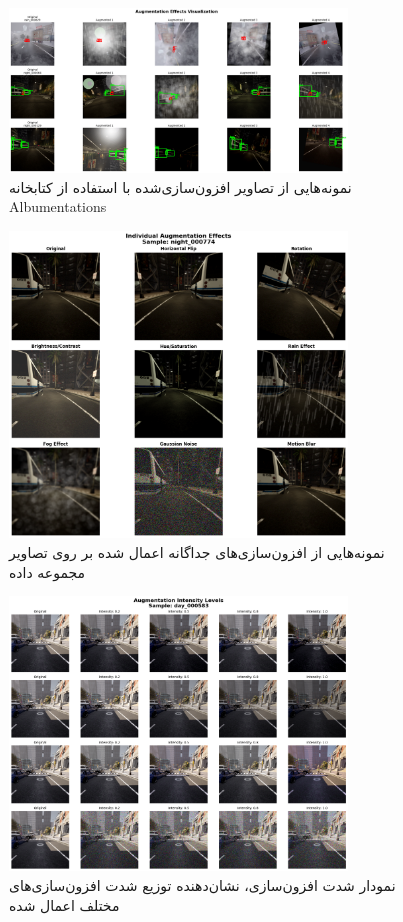 \documentclass[oneside]{report}
\begin{document}
\begin{figure}[H]
  \centering
  \includegraphics[width=0.8\textwidth]{images/data2/augmentation_visualization.png}
  \caption{نمونه‌هایی از تصاویر افزون‌سازی‌شده با استفاده از کتابخانه Albumentations}
\end{figure}
\begin{figure}[H]
  \centering
  \includegraphics[width=0.8\textwidth]{images/data2/individual_augmentations.png}
  \caption{نمونه‌هایی از افزون‌سازی‌های جداگانه اعمال شده بر روی تصاویر مجموعه داده}
\end{figure}

\begin{figure}[H]
  \centering
  \includegraphics[width=0.8\textwidth]{images/data2/augmentation_intensity.png}
  \caption  {نمودار شدت افزون‌سازی، نشان‌دهنده توزیع شدت افزون‌سازی‌های مختلف اعمال شده}
\end{figure}
\end{document}
